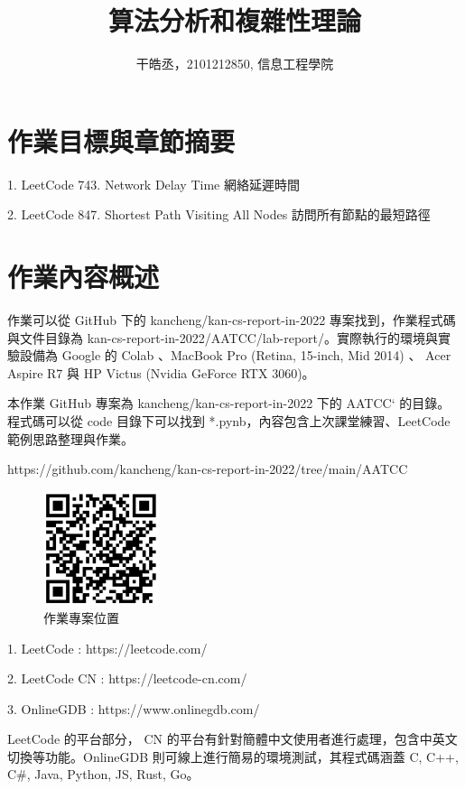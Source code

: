\documentclass[10pt,UTF8]{ctexart}
\title{算法分析和複雜性理論}
\author{干皓丞，2101212850, 信息工程學院}
\begin{document}
\maketitle


\section{作業目標與章節摘要}

1. LeetCode 743. Network Delay Time 網絡延遲時間

2. LeetCode 847. Shortest Path Visiting All Nodes 訪問所有節點的最短路徑


\section{作業內容概述}

作業可以從 GitHub 下的 kancheng/kan-cs-report-in-2022 專案找到，作業程式碼與文件目錄為 kan-cs-report-in-2022/AATCC/lab-report/。實際執行的環境與實驗設備為 Google 的 Colab 、MacBook Pro (Retina, 15-inch, Mid 2014) 、 Acer Aspire R7 與 HP Victus (Nvidia GeForce RTX 3060)。

本作業 GitHub 專案為 kancheng/kan-cs-report-in-2022 下的 AATCC` 的目錄。程式碼可以從 code 目錄下可以找到 *.pynb，內容包含上次課堂練習、LeetCode 範例思路整理與作業。

https://github.com/kancheng/kan-cs-report-in-2022/tree/main/AATCC

\begin{figure}[H]
\centering 
\includegraphics[width=0.30\textwidth]{aatccqr.png} 
\caption{作業專案位置}
\label{Test}
\end{figure}


1. LeetCode : https://leetcode.com/

2. LeetCode CN : https://leetcode-cn.com/

3. OnlineGDB : https://www.onlinegdb.com/ 

LeetCode 的平台部分， CN 的平台有針對簡體中文使用者進行處理，包含中英文切換等功能。OnlineGDB 則可線上進行簡易的環境測試，其程式碼涵蓋 C, C++, C\#, Java, Python, JS, Rust, Go。
\end{document}
